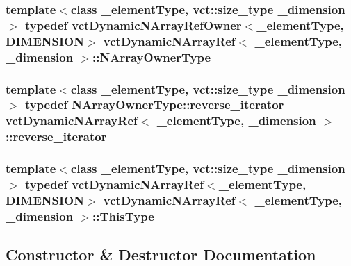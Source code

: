 \subsubsection[{N\+Array\+Owner\+Type}]{\setlength{\rightskip}{0pt plus 5cm}template$<$class \+\_\+element\+Type, vct\+::size\+\_\+type \+\_\+dimension$>$ typedef {\bf vct\+Dynamic\+N\+Array\+Ref\+Owner}$<$\+\_\+element\+Type, {\bf D\+I\+M\+E\+N\+S\+I\+O\+N}$>$ {\bf vct\+Dynamic\+N\+Array\+Ref}$<$ \+\_\+element\+Type, \+\_\+dimension $>$\+::{\bf N\+Array\+Owner\+Type}}\label{classvct_dynamic_n_array_ref_a64f8693e4cbab79b5b73e1e3a8620dca}
\hypertarget{classvct_dynamic_n_array_ref_a94a5409f7d94313da64fc744ddd2b484}{}
\subsubsection[{reverse\+\_\+iterator}]{\setlength{\rightskip}{0pt plus 5cm}template$<$class \+\_\+element\+Type, vct\+::size\+\_\+type \+\_\+dimension$>$ typedef {\bf N\+Array\+Owner\+Type\+::reverse\+\_\+iterator} {\bf vct\+Dynamic\+N\+Array\+Ref}$<$ \+\_\+element\+Type, \+\_\+dimension $>$\+::{\bf reverse\+\_\+iterator}}\label{classvct_dynamic_n_array_ref_a94a5409f7d94313da64fc744ddd2b484}
\hypertarget{classvct_dynamic_n_array_ref_a157266ffe0ad737f4df13dcf499a4494}{}
\subsubsection[{This\+Type}]{\setlength{\rightskip}{0pt plus 5cm}template$<$class \+\_\+element\+Type, vct\+::size\+\_\+type \+\_\+dimension$>$ typedef {\bf vct\+Dynamic\+N\+Array\+Ref}$<$\+\_\+element\+Type, {\bf D\+I\+M\+E\+N\+S\+I\+O\+N}$>$ {\bf vct\+Dynamic\+N\+Array\+Ref}$<$ \+\_\+element\+Type, \+\_\+dimension $>$\+::{\bf This\+Type}}\label{classvct_dynamic_n_array_ref_a157266ffe0ad737f4df13dcf499a4494}


\subsection{Constructor \& Destructor Documentation}
\hypertarget{classvct_dynamic_n_array_ref_a2466569633dabf250c3b8a05ada50f97}{}
